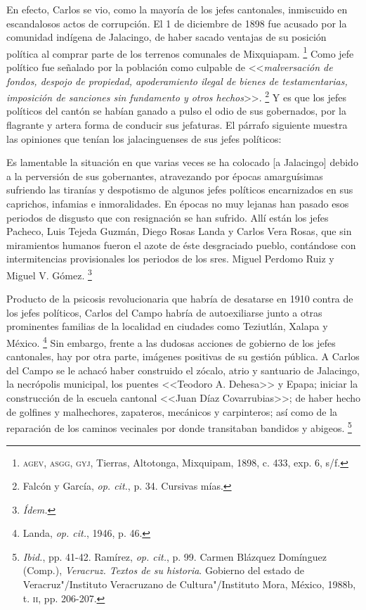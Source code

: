 \documentclass[14pt,twoside,final]{extbook} %
\let\oldfootnote\footnote
\renewcommand\footnote[1]{%
\oldfootnote{\hspace{1mm}#1}}
\begin{document}
En efecto, Carlos se vio, como la mayoría de los jefes cantonales, inmiscuido en escandalosos actos de corrupción. El 1 de diciembre de 1898 fue acusado por la comunidad indígena de Jalacingo, de haber sacado ventajas de su posición política al comprar parte de los terrenos comunales de Mixquiapam.\footnote{\textsc{agev, asgg, gyj}, Tierras, Altotonga, Mixquipam, 1898, c. 433, exp. 6, s/f.} Como jefe político fue señalado por la población como culpable de <<\emph{malversación de fondos, despojo de propiedad, apoderamiento ilegal de bienes de testamentarias, imposición de sanciones sin fundamento y otros hechos}>>.\footnote{Falcón y García, \emph{op. cit.}, p. 34. Cursivas mías.} Y es que los jefes políticos del cantón se habían ganado a pulso el odio de sus gobernados, por la flagrante y artera forma de conducir sus jefaturas. El párrafo siguiente muestra las opiniones que tenían los jalacinguenses de sus jefes políticos:
\begin{quoting}
Es lamentable la situación en que varias veces se ha colocado [a Jalacingo] debido a la perversión de sus gobernantes, atravezando por épocas amarguísimas sufriendo las tiranías y despotismo de algunos jefes políticos encarnizados en sus caprichos, infamias e inmoralidades. En épocas no muy lejanas han pasado esos periodos de disgusto que con resignación se han sufrido. Allí están los jefes Pacheco, Luis Tejeda Guzmán, Diego Rosas Landa y Carlos Vera Rosas, que sin miramientos humanos fueron el azote de éste desgraciado pueblo, contándose con intermitencias provisionales los periodos de los sres. Miguel Perdomo Ruiz y Miguel V. Gómez.\footnote{\em Ídem.}
\end{quoting}
Producto de la psicosis revolucionaria que habría de desatarse en 1910 contra de los jefes políticos, Carlos del Campo habría de autoexiliarse junto a otras prominentes familias de la localidad en ciudades como Teziutlán, Xalapa y México.\footnote{Landa, \emph{op. cit.}, 1946, p. 46.} Sin embargo, frente a las dudosas acciones de gobierno de los jefes cantonales, hay por otra parte, imágenes positivas de su gestión pública. A Carlos del Campo se le achacó haber construido el zócalo, atrio y santuario de Jalacingo, la necrópolis municipal, los puentes <<Teodoro A. Dehesa>> y Epapa; iniciar la construcción de la escuela cantonal <<Juan Díaz Covarrubias>>; de haber hecho de golfines y malhechores, zapateros, mecánicos y carpinteros; así como de la reparación de los caminos vecinales por donde transitaban bandidos y abigeos.\footnote{\emph{Ibid.}, pp. 41-42. Ramírez, \emph{op. cit.}, p. 99. Carmen Blázquez Domínguez (Comp.), \emph{Veracruz. Textos de su historia}. Gobierno del estado de Veracruz"/Instituto Veracruzano de Cultura"/Instituto Mora, México, 1988b, t. \textsc{ii}, pp. 206-207.}
\end{document}
